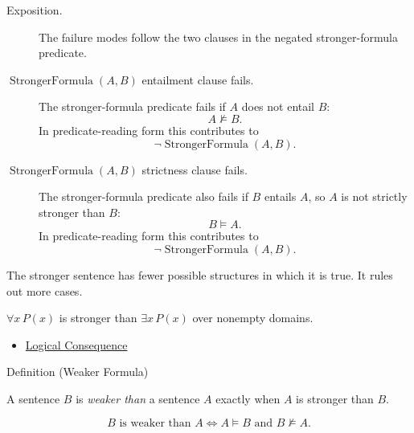 \begin{remark*}
\begin{description}
  \item[Exposition.] The failure modes follow the two clauses in the negated
  stronger-formula predicate.
  \item[\(\operatorname{StrongerFormula}(A,B)\) entailment clause fails.] The
  stronger-formula predicate fails if \(A\) does not entail \(B\):
  \[
  A\not\models B.
  \]
  In predicate-reading form this contributes to
  \[
  \neg\operatorname{StrongerFormula}(A,B).
  \]
  \item[\(\operatorname{StrongerFormula}(A,B)\) strictness clause fails.] The
  stronger-formula predicate also fails if \(B\) entails \(A\), so \(A\) is not
  strictly stronger than \(B\):
  \[
  B\models A.
  \]
  In predicate-reading form this contributes to
  \[
  \neg\operatorname{StrongerFormula}(A,B).
  \]
\end{description}
\end{remark*}

\begin{remark*}[Interpretation]
The stronger sentence has fewer possible structures in which it is true. It
rules out more cases.
\end{remark*}

\begin{remark*}[Examples]
\(\forall x\,P(x)\) is stronger than \(\exists x\,P(x)\) over nonempty
domains.
\end{remark*}

\begin{dependencies}
\begin{itemize}
  \item \hyperref[def:log-consequence]{Logical Consequence}
\end{itemize}
\end{dependencies}

\begin{definitionbox}{Definition (Weaker Formula)}
\begin{definition}
\label{def:weaker-formula}
A sentence \(B\) is \emph{weaker than} a sentence \(A\) exactly when \(A\) is
stronger than \(B\).
\end{definition}
\end{definitionbox}

\begin{remark*}
\[
B \text{ is weaker than } A
\Longleftrightarrow
A\models B
\text{ and }
B\not\models A.
\]
\end{remark*}

